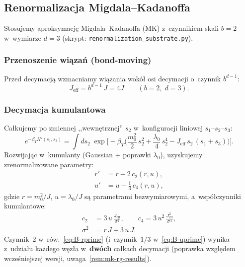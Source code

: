 \subsection{Renormalizacja Migdala--Kadanoffa}\label{app:B-MK}

Stosujemy aproksymacj\k{e} Migdala--Kadanoffa (MK) z~czynnikiem
skali $b = 2$ w~wymiarze $d = 3$
(skrypt: \texttt{renormalization\_substrate.py}).

\subsubsection{Przenoszenie wi\k{a}za\'n (bond-moving)}

Przed decymacj\k{a} wzmacniamy wi\k{a}zania wok\'o\l{} osi
decymacji o~czynnik $b^{d-1}$:
\begin{equation}\label{eq:B-bond-move}
  J_{\mathrm{eff}} = b^{d-1}\,J = 4J \qquad (b=2,\;d=3).
\end{equation}

\subsubsection{Decymacja kumulantowa}

Ca\l{}kujemy po zmiennej ,,wewn\k{e}trznej'' $s_2$
w~konfiguracji liniowej $s_1$--$s_2$--$s_3$:
\begin{equation}\label{eq:B-decimation}
  e^{-\beta_T H'(s_1,s_3)}
  = \int ds_2\;\exp\!\biggl[-\beta_T\!\biggl(
    \frac{m_0^2}{2}\,s_2^2 + \frac{\lambda_0}{4}\,s_2^4
    - J_{\mathrm{eff}}\,s_2\,(s_1+s_3)
  \biggr)\biggr].
\end{equation}
Rozwijaj\k{a}c w~kumulanty (Gaussian + poprawki $\lambda_0$),
uzyskujemy zrenormalizowane parametry:
\begin{align}
  r' &= r - 2\,c_2(r, u), \label{eq:B-rprime}\\
  u' &= u - \tfrac{1}{3}\,c_4(r, u), \label{eq:B-uprime}
\end{align}
gdzie $r = m_0^2/J$, $u = \lambda_0/J$ s\k{a} parametrami
bezwymiarowymi, a~wsp\'o\l{}czynniki kumulantowe:
\begin{align}
  c_2 &= 3\,u\,\frac{J_{\mathrm{eff}}}{\sigma^2}, \qquad
  c_4 = 3\,u^2\,\frac{J_{\mathrm{eff}}^2}{\sigma^4}, \\
  \sigma^2 &= r\,J + 3\,u\,J.
\end{align}
Czynnik~$2$ w~r\'ow.~\eqref{eq:B-rprime}
(i~czynnik~$1/3$ w~\eqref{eq:B-uprime})
wynika z~udzia\l{}u ka\.zdego w\k{e}z\l{}a w~\textbf{dw\'och}
ca\l{}kach decymacji (poprawka wzgl\k{e}dem wcze\'sniejszej
wersji, uwaga~\ref{rem:mk-rg-results}).


